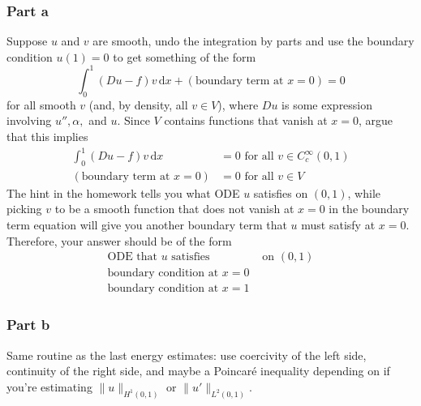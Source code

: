 \documentclass{article}
\theoremstyle{definition}
\theoremstyle{plain}
\renewcommand{\d}{\mathrm d}
\begin{document}
\subsubsection{Part a}
Suppose $u$ and $v$ are smooth, undo the integration by parts and use the boundary condition $u(1) = 0$ to get something of the form
\begin{equation}
    \int_0^1 (Du - f)v\,\d x + (\text{boundary term at }x = 0) = 0 
\end{equation}
for all smooth $v$ (and, by density, all $v \in V$), where $Du$ is some expression involving $u'',\alpha,$ and $u$.
Since $V$ contains functions that vanish at $x = 0$, argue that this implies 
\begin{align}
    \int_0^1(Du-f)v\,\d x & = 0 \text{ for all } v \in C_c^\infty(0,1) \\
    (\text{boundary term at }x=0) & = 0 \text{ for all } v \in V
\end{align}
The hint in the homework tells you what ODE $u$ satisfies on $(0,1)$, while picking $v$ to be a smooth function that does not vanish at $x = 0$ in the boundary term equation will give you another boundary term that $u$ must satisfy at $x = 0$.
Therefore, your answer should be of the form
\begin{align}
    \text{ODE that } u \text{ satisfies } & \text{ on } (0,1) \\
    \text{boundary condition at } x = 0 \\
    \text{boundary condition at } x = 1
\end{align}

\subsubsection{Part b}
Same routine as the last energy estimates: use coercivity of the left side, continuity of the right side, and maybe a Poincar\'e inequality depending on if you're estimating $\|u\|_{H^1(0,1)}$ or $\|u'\|_{L^2(0,1)}$.
\end{document}
